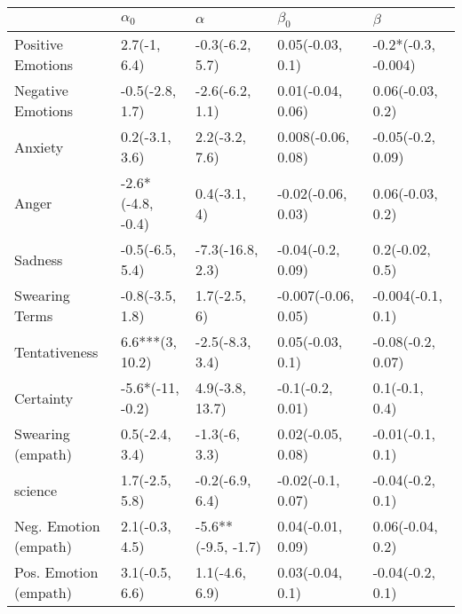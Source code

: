 \begin{tabular}{lllll}
\toprule
{} &         $\alpha_0$ &            $\alpha$ &            $\beta_0$ &              $\beta$ \\
\midrule
Positive Emotions     &       2.7(-1, 6.4) &     -0.3(-6.2, 5.7) &     0.05(-0.03, 0.1) &  -0.2*(-0.3, -0.004) \\
Negative Emotions     &    -0.5(-2.8, 1.7) &     -2.6(-6.2, 1.1) &    0.01(-0.04, 0.06) &     0.06(-0.03, 0.2) \\
Anxiety               &     0.2(-3.1, 3.6) &      2.2(-3.2, 7.6) &   0.008(-0.06, 0.08) &    -0.05(-0.2, 0.09) \\
Anger                 &  -2.6*(-4.8, -0.4) &        0.4(-3.1, 4) &   -0.02(-0.06, 0.03) &     0.06(-0.03, 0.2) \\
Sadness               &    -0.5(-6.5, 5.4) &    -7.3(-16.8, 2.3) &    -0.04(-0.2, 0.09) &      0.2(-0.02, 0.5) \\
Swearing Terms        &    -0.8(-3.5, 1.8) &        1.7(-2.5, 6) &  -0.007(-0.06, 0.05) &    -0.004(-0.1, 0.1) \\
Tentativeness         &    6.6***(3, 10.2) &     -2.5(-8.3, 3.4) &     0.05(-0.03, 0.1) &    -0.08(-0.2, 0.07) \\
Certainty             &   -5.6*(-11, -0.2) &     4.9(-3.8, 13.7) &     -0.1(-0.2, 0.01) &       0.1(-0.1, 0.4) \\
Swearing (empath)     &     0.5(-2.4, 3.4) &       -1.3(-6, 3.3) &    0.02(-0.05, 0.08) &     -0.01(-0.1, 0.1) \\
science               &     1.7(-2.5, 5.8) &     -0.2(-6.9, 6.4) &    -0.02(-0.1, 0.07) &     -0.04(-0.2, 0.1) \\
Neg. Emotion (empath) &     2.1(-0.3, 4.5) &  -5.6**(-9.5, -1.7) &    0.04(-0.01, 0.09) &     0.06(-0.04, 0.2) \\
Pos. Emotion (empath) &     3.1(-0.5, 6.6) &      1.1(-4.6, 6.9) &     0.03(-0.04, 0.1) &     -0.04(-0.2, 0.1) \\
\bottomrule
\end{tabular}
